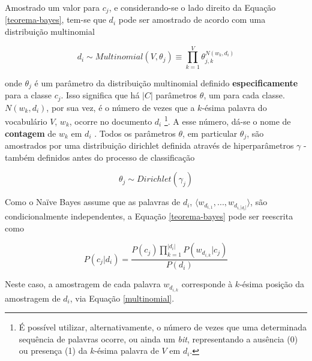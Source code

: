 Amostrado um valor para \ensuremath{c_j}, e considerando-se o lado direito da Equação \ref{teorema-bayes}, tem-se que \ensuremath{d_i} pode ser amostrado de acordo com uma distribuição multinomial \cite{resnik}

\begin{equation}
\label{multinomial}
\ensuremath{d_i \sim Multinomial(V, \theta_j) \equiv \prod_{k = 1}^{V}\theta_{j,k}^{N(w_k, d_i)}}
\end{equation}

onde \ensuremath{\theta_j} é um parâmetro da distribuição multinomial definido \textbf{especificamente} para a classe \ensuremath{c_j}. Isso significa que há \ensuremath{|C|} parâmetros \ensuremath{\theta}, um para cada classe. \ensuremath{N(w_k, d_i)}, por sua vez, é o número de vezes que a \ensuremath{k}-ésima palavra do vocabulário \ensuremath{V}, \ensuremath{w_k}, ocorre no documento \ensuremath{d_i} \cite{resnik}\footnote{É possível utilizar, alternativamente, o número de vezes que uma determinada sequência de palavras ocorre, ou ainda um \emph{bit}, representando a ausência (0) ou presença (1) da \ensuremath{k}-ésima palavra de \ensuremath{V} em \ensuremath{d_i}.}. A esse número, dá-se o nome de \textbf{contagem} de \ensuremath{w_k} em \ensuremath{d_i} \cite{nigam}. Todos os parâmetros \ensuremath{\theta}, em particular \ensuremath{\theta_j}, são amostrados por uma distribuição dirichlet definida através de hiperparâmetros \ensuremath{\gamma} - também definidos antes do processo de classificação \cite{resnik}


\begin{equation}
\label{dirichlet}
  \ensuremath{\theta_j \sim Dirichlet(\gamma_j)}
\end{equation}

Como o Naïve Bayes assume que as palavras de \ensuremath{d_i}, \ensuremath{\langle w_{d_{i,1}}, ..., w_{d_{i,|d_i|}} \rangle}, são condicionalmente independentes, a Equação \ref{teorema-bayes} pode ser reescrita como \cite{naive-forty}

\begin{equation}
\label{teorema-bayes2}
\ensuremath{P(c_j | d_i) = \frac{P(c_j)\prod_{k = 1}^{|d_i|}P(w_{d_{i,k}} | c_j)}{P(d_i)}}
\end{equation}

Neste caso, a amostragem de cada palavra \ensuremath{w_{d_{i,k}}} corresponde à \ensuremath{k}-ésima posição da amostragem de \ensuremath{d_i}, via Equação \ref{multinomial}.

